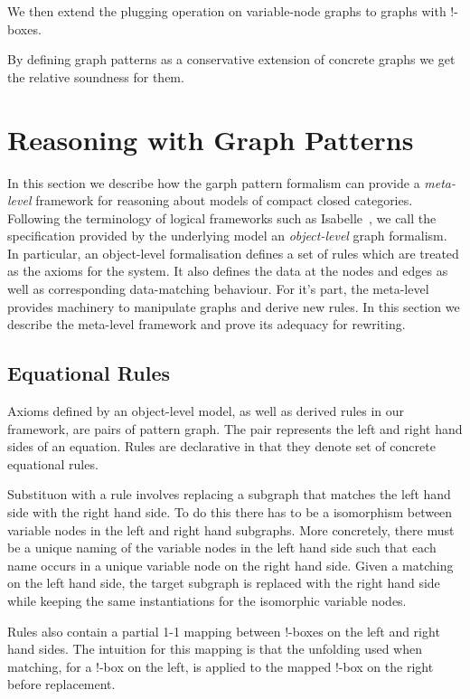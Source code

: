 \documentclass[runningheads]{llncs}
\begin{document}
We then extend the plugging
operation on variable-node graphs to graphs with !-boxes.


By defining graph patterns as a conservative extension of concrete
graphs we get the relative soundness for them.



\section{Reasoning with Graph Patterns}
\label{sec:rewriting}

In this section we describe how the garph pattern formalism can
provide a \emph{meta-level} framework for reasoning about models of
compact closed categories. Following the terminology of logical
frameworks such as Isabelle~\cite{isabelle}, we call the specification
provided by the underlying model an \emph{object-level} graph
formalism. In particular, an object-level formalisation defines a set
of rules which are treated as the axioms for the system. It also
defines the data at the nodes and edges as well as corresponding
data-matching behaviour. For it's part, the meta-level provides
machinery to manipulate graphs and derive new rules. In this section
we describe the meta-level framework and prove its adequacy for
rewriting.

\subsection{Equational Rules}

Axioms defined by an object-level model, as well as derived rules in
our framework, are pairs of pattern graph. The pair represents the
left and right hand sides of an equation. Rules are declarative in
that they denote set of concrete equational rules. 

Substituon with a rule involves replacing a subgraph that matches the
left hand side with the right hand side. To do this there has to be a
isomorphism between variable nodes in the left and right hand
subgraphs. More concretely, there must be a unique naming of the
variable nodes in the left hand side such that each name occurs in a
unique variable node on the right hand side. Given a matching on the
left hand side, the target subgraph is replaced with the right hand
side while keeping the same instantiations for the isomorphic variable
nodes. 

Rules also contain a partial 1-1 mapping between !-boxes on the left
and right hand sides. The intuition for this mapping is that the
unfolding used when matching, for a !-box on the left, is applied to
the mapped !-box on the right before replacement. 
\end{document}
